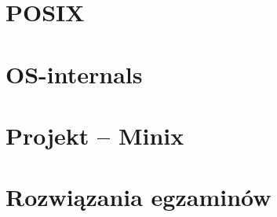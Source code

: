 \documentclass[12pt, a4paper, polish, openany]{book}
\begin{document}
\frontmatter



\tableofcontents


\mainmatter

\chapter{POSIX}


\chapter{OS-internals}


\chapter{Projekt -- Minix}


\chapter{Rozwiązania egzaminów}

\end{document}
